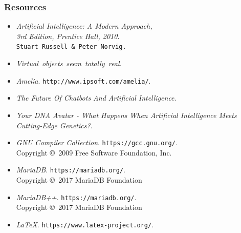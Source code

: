 \documentclass[12pt]{beamer}
\begin{document}
	\begin{frame}
	\frametitle{Resources}
		\begin{itemize}
			\item
			{\itshape Artificial Intelligence: A Modern Approach, \\ 3rd Edition, Prentice Hall, 2010}. \\
			\texttt{Stuart Russell \& Peter Norvig.} \\
			\item
			{\itshape Virtual\ objects\ seem\ totally\ real}.
			\\
			\item
			{\itshape Amelia}.
			\texttt{http://www.ipsoft.com/amelia/}. \\
			\item
			{\itshape The Future Of Chatbots And Artificial Intelligence}.
			\item
			{\itshape Your DNA Avatar - What Happens When Artificial Intelligence Meets Cutting-Edge Genetics?}.
			\item%
			{\itshape GNU Compiler Collection}.
			\texttt{https://gcc.gnu.org/}. \\
			Copyright \copyright\  2009 Free Software Foundation, Inc.
			\item%
			{\itshape MariaDB}.
			\texttt{https://mariadb.org/}. \\
			Copyright \copyright\  2017 MariaDB Foundation
			\item%
			{\itshape MariaDB++}.
			\texttt{https://mariadb.org/}. \\
			Copyright \copyright\  2017 MariaDB Foundation
			\item%
			{\itshape \LaTeX}.
			\texttt{https://www.latex-project.org/}.
		\end{itemize}
	\end{frame}
	
\end{document}
